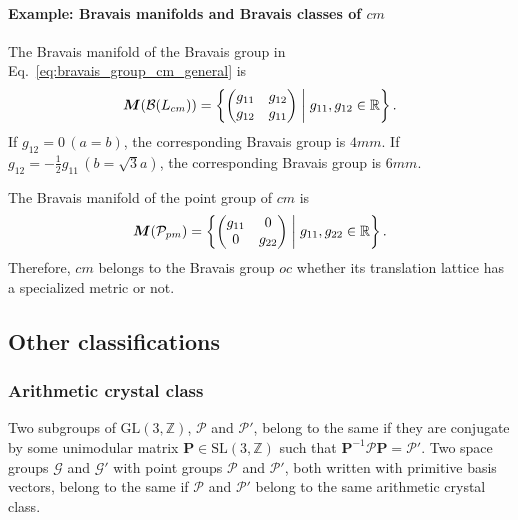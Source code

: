 \paragraph{Example: Bravais manifolds and Bravais classes of $cm$}

The Bravais manifold of the Bravais group in Eq.~\eqref{eq:bravais_group_cm_general} is
\begin{align*}
  \bm{M}(\mathcal{B}(L_{cm})) = \left\{ 
    \begin{pmatrix} g_{11} & g_{12} \\ g_{12} & g_{11} \end{pmatrix}
   \mathrel{}\middle|\mathrel{} 
    g_{11}, g_{12} \in \mathbb{R}
   \right\}.
\end{align*}
If $g_{12} = 0 \, (a = b)$, the corresponding Bravais group is $4mm$.
If $g_{12} = -\frac{1}{2} g_{11} \, (b = \sqrt{3} a)$, the corresponding Bravais group is $6mm$.

The Bravais manifold of the point group of $cm$ is
\begin{align*}
  \bm{M}(\mathcal{P}_{pm}) = \left\{ 
    \begin{pmatrix} g_{11} & 0 \\ 0 & g_{22} \end{pmatrix}
   \mathrel{}\middle|\mathrel{} 
    g_{11}, g_{22} \in \mathbb{R}
   \right\}.
\end{align*}
Therefore, $cm$ belongs to the Bravais group $oc$ whether its translation lattice has a specialized metric or not.

\subsection{Other classifications}

\subsubsection{\label{sec:arithmetic-crystal-class}Arithmetic crystal class}

\begin{screen}
  \begin{defn}
    Two subgroups of $\mathrm{GL}(3, \mathbb{Z})$, $\mathcal{P}$ and $\mathcal{P}'$, belong to the same  if they are conjugate by some unimodular matrix $\bm{P} \in \mathrm{SL}(3, \mathbb{Z})$ such that $\bm{P}^{-1} \mathcal{P} \bm{P} = \mathcal{P}'$.
    Two space groups $\mathcal{G}$ and $\mathcal{G}'$ with point groups $\mathcal{P}$ and $\mathcal{P}'$, both written with primitive basis vectors, belong to the same  if $\mathcal{P}$ and $\mathcal{P}'$ belong to the same arithmetic crystal class.
  \end{defn}
\end{screen}


